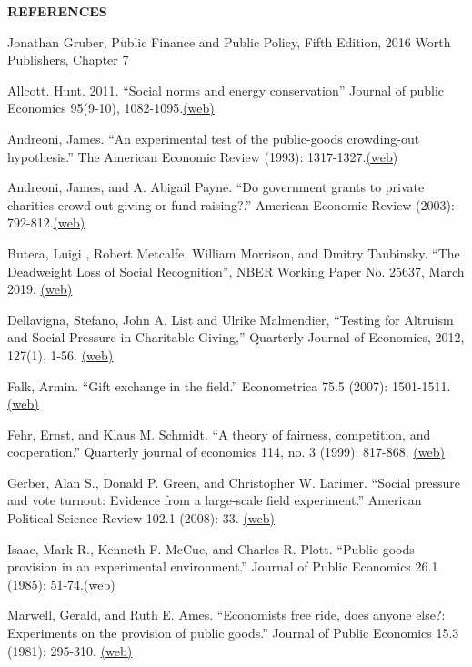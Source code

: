 \documentclass[landscape]{slides}
\begin{document}
\begin{slide}
\begin{center}
{\bf REFERENCES}
\end{center}
{\small

Jonathan Gruber, Public Finance and Public Policy, Fifth Edition, 2016 Worth Publishers, Chapter 7

Allcott. Hunt. 2011. ``Social norms and energy conservation''
Journal of public Economics 95(9-10), 1082-1095.\href{http://elsa.berkeley.edu/~saez/course131/allcott2011.pdf}{(web)}

Andreoni, James. ``An experimental test of the public-goods crowding-out hypothesis.'' The American Economic Review (1993): 1317-1327.\href{http://elsa.berkeley.edu/~saez/course131/Andreoni93.pdf}{(web)}

Andreoni, James, and A. Abigail Payne. ``Do government grants to private charities crowd out giving or fund-raising?.'' American Economic Review (2003): 792-812.\href{http://www.jstor.org/stable/pdfplus/3132117.pdf}{(web)}

Butera, Luigi , Robert Metcalfe, William Morrison, and Dmitry Taubinsky. ``The Deadweight Loss of Social Recognition'', NBER Working Paper No. 25637,
March 2019. \href{https://www.nber.org/papers/w25637.pdf}{(web)}

Dellavigna, Stefano, John A. List and Ulrike Malmendier, ``Testing for Altruism and Social Pressure in Charitable Giving,'' Quarterly Journal of Economics,  2012, 127(1), 1-56.
\href{http://elsa.berkeley.edu/~saez/course131/Dellavigna12.pdf}{(web)}

Falk, Armin. ``Gift exchange in the field.'' Econometrica 75.5 (2007): 1501-1511.\href{http://www.jstor.org/stable/pdfplus/4502037.pdf?&acceptTC=true&jpdConfirm=true}{(web)}

Fehr, Ernst, and Klaus M. Schmidt. ``A theory of fairness, competition, and cooperation.'' Quarterly journal of economics 114, no. 3 (1999): 817-868.
\href{https://www.jstor.org/stable/pdf/2586885.pdf}{(web)}

Gerber, Alan S., Donald P. Green, and Christopher W. Larimer. ``Social pressure and vote turnout: Evidence from a large-scale field experiment.'' American Political Science Review 102.1 (2008): 33. \href{http://www.jstor.org/stable/pdfplus/27644496.pdf?&acceptTC=true&jpdConfirm=true}{(web)}


Isaac, Mark R., Kenneth F. McCue, and Charles R. Plott. ``Public goods provision in an experimental environment.'' Journal of Public Economics 26.1 (1985): 51-74.\href{http://elsa.berkeley.edu/~saez/course131/Isaac-McCue-Plott85.pdf}{(web)}

Marwell, Gerald, and Ruth E. Ames. ``Economists free ride, does anyone else?: Experiments on the provision of public goods.'' Journal of Public Economics 15.3 (1981): 295-310. \href{http://elsa.berkeley.edu/~saez/course131/Marwell-Ames81.pdf}{(web)}

}

\end{slide}
\end{document}
